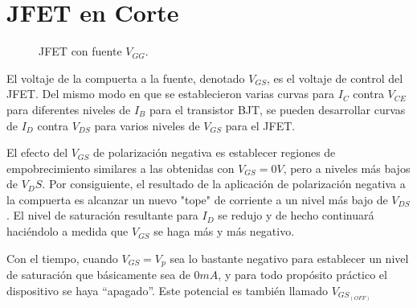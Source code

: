 \chapter{JFET en Corte}
  \begin{figure}
    \centering
    \resizebox{!}{\linewidth}{
    
    }
    \caption{JFET con fuente $V_{GG}$.}
    \label{fig:jfet.pol-corte}
  \end{figure}
El voltaje de la compuerta a la fuente, denotado $V_{GS}$, es el voltaje de control del JFET. Del mismo modo en que se
establecieron varias curvas para $I_C$ contra $V_{CE}$ para diferentes niveles de $I_B$ para el transistor BJT, se
pueden desarrollar curvas de $I_D$ contra $V_{DS}$ para varios niveles de $V_{GS}$ para el JFET.

El efecto del $V_{GS}$ de polarización negativa es establecer regiones de empobrecimiento similares a las obtenidas con
$V_{GS} = 0V$, pero a niveles más bajos de $V_DS$. Por consiguiente, el resultado de la aplicación de polarización
negativa a la compuerta es alcanzar un nuevo "tope" de corriente a un nivel más bajo de $V_{DS}$. El nivel de saturación
resultante para $I_D$ se redujo y de hecho continuará haciéndolo a medida que $V_{GS}$ se haga más y más negativo.

Con el tiempo, cuando $V_{GS} = V_p$ sea lo bastante negativo para establecer un nivel de saturación que básicamente sea
de $0 mA$, y para todo propósito práctico el dispositivo se haya “apagado”. Este potencial es también llamado
$V_{GS_{(OFF)}}$

